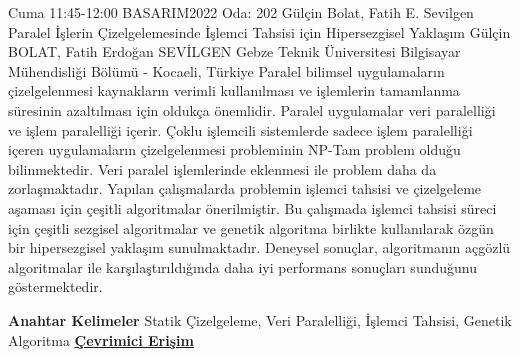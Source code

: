 
    \begin{abstract_basarim}
    {Cuma 11:45-12:00}
    {BASARIM2022}
    {Oda: 202}
    {Gülçin Bolat, Fatih E. Sevilgen}
    {Paralel İşlerin Çizelgelemesinde İşlemci Tahsisi için Hipersezgisel Yaklaşım}
    {%
    Gülçin BOLAT, Fatih Erdoğan SEVİLGEN}
    {%
    }
    {%
    Gebze Teknik Üniversitesi Bilgisayar Mühendisliği Bölümü - Kocaeli, Türkiye}
    Paralel bilimsel uygulamaların çizelgelenmesi kaynakların verimli kullanılması ve işlemlerin tamamlanma süresinin azaltılması için oldukça önemlidir. Paralel uygulamalar veri paralelliği ve işlem paralelliği içerir. Çoklu işlemcili sistemlerde sadece işlem paralelliği içeren uygulamaların çizelgelenmesi probleminin NP-Tam problem olduğu bilinmektedir. Veri paralel işlemlerinde eklenmesi ile problem daha da zorlaşmaktadır. Yapılan çalışmalarda problemin işlemci tahsisi ve çizelgeleme aşaması için çeşitli algoritmalar önerilmiştir. Bu çalışmada işlemci tahsisi süreci için çeşitli sezgisel algoritmalar ve genetik algoritma birlikte kullanılarak özgün bir hipersezgisel yaklaşım sunulmaktadır. Deneysel sonuçlar, algoritmanın açgözlü algoritmalar ile karşılaştırıldığında daha iyi performans sonuçları sunduğunu göstermektedir. 
    
            \textbf{Anahtar Kelimeler} \newline{}Statik Çizelgeleme, Veri Paralelliği, İşlemci Tahsisi, Genetik Algoritma
     \newline\newline\noindent \href{https://drive.google.com/file/d/1c0jtPiYMLjmZWjQ-hv_Q2JxYoaVz1Az0/view?usp=drivesdk}{\bfseries Çevrimici Erişim}
    \end{abstract_basarim}
    